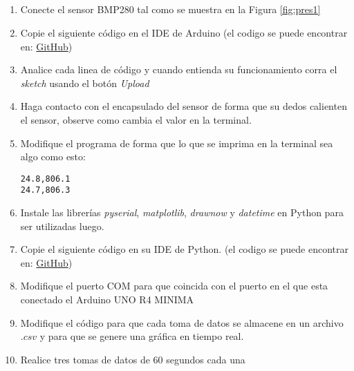 \subsection{\pro}
\begin{enumerate}
    \item Conecte el sensor BMP280 tal como se muestra en la Figura \ref{fig:pres1}
    \item Copie el siguiente código en el IDE de Arduino (el codigo se puede encontrar en: \href{https://github.com/juanjorojash/instrumentacion_I/blob/master/code/L03/L03.ino}{GitHub})
      
    \item Analice cada linea de código y cuando entienda su funcionamiento corra el \emph{sketch} usando el botón \emph{Upload}
    \item Haga contacto con el encapsulado del sensor de forma que su dedos calienten el sensor, observe como cambia el valor en la terminal. 
    \item Modifique el programa de forma que lo que se imprima en la terminal sea algo como esto:
\begin{verbatim}
24.8,806.1
24.7,806.3
\end{verbatim}
    \item Instale las librerías \emph{pyserial}, \emph{matplotlib}, \emph{drawnow} y \emph{datetime} en Python para ser utilizadas luego.
    \item Copie el siguiente código en su IDE de Python. (el codigo se puede encontrar en: \href{https://github.com/juanjorojash/instrumentacion_I/blob/master/code/L03/L03.py}{GitHub})
    
    \item Modifique el puerto COM para que coincida con el puerto en el que esta conectado el Arduino UNO R4 MINIMA
    \item Modifique el código para que cada toma de datos se almacene en un archivo $.csv$ y para que se genere una gráfica en tiempo real.
    \item Realice tres tomas de datos de 60 segundos cada una
\end{enumerate}

